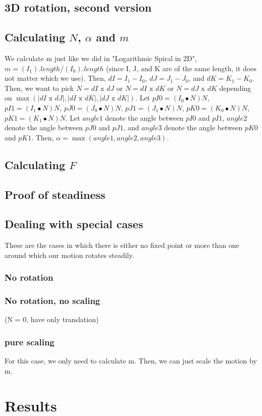 \documentclass[journal, letterpaper]{IEEEtran}
\begin{document}
\subsection{3D rotation, second version}


\subsection{Calculating $N$, $\alpha$ and $m$}
We calculate m just like we did in "Logarithmic Spiral in 2D", $m = (I_1).length / (I_0).length$ (since I, J, and K are of the same length, it does not matter which we use).  Then, $dI = I_1 - I_0$, $dJ = J_1 - J_0$, and $dK = K_1 - K_0$.  Then, we want to pick $N = dI\text{ x }dJ$ or $N = dI\text{ x }dK$ or $N = dJ\text{ x }dK$ depending on $\max{(|dI\text{ x }dJ|, |dI\text{ x  }dK|, |dJ\text{ x }dK|)}$.  
Let $pI0 = (I_0 \bullet N)N$, $pI1 = (I_1 \bullet N)N$, $pJ0 = (J_0 \bullet N)N$, $pJ1 = (J_1 \bullet N)N$, $pK0 = (K_0 \bullet N)N$, $pK1 = (K_1 \bullet N)N$.  Let $angle1$ denote the angle between $pI0$ and $pI1$, $angle2$ denote the angle between $pJ0$ and $pJ1$, and $angle3$ denote the angle between $pK0$ and $pK1$.  Then, $\alpha = \max{(angle1, angle2, angle3)}$. 

\subsection{Calculating $F$}

\subsection{Proof of steadiness}

\subsection{Dealing with special cases}
These are the cases in which there is either no fixed point or more than one around which our motion rotates steadily.

\subsubsection{No rotation}

\subsubsection{No rotation, no scaling}
(N = 0, have only translation)

\subsubsection{pure scaling}
For this case, we only need to calculate m.  Then, we can just scale the motion by m.

\section{Results}
\end{document}
